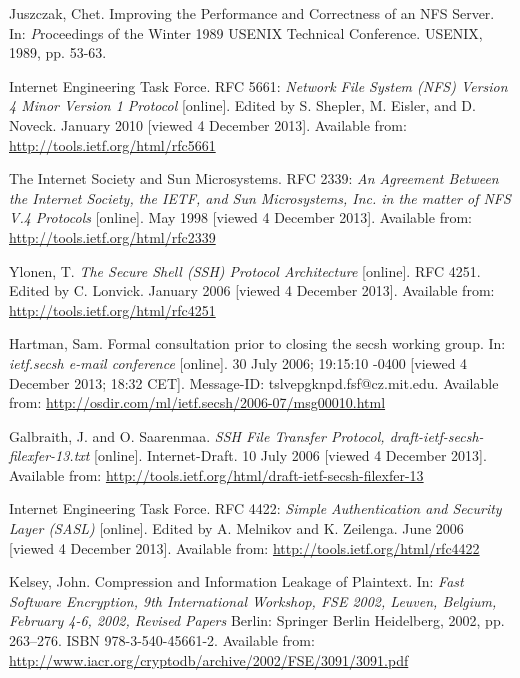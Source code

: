 \begin{thebibliography}{99}
	{\sc Juszczak,} Chet.
	Improving the Performance and Correctness of an NFS Server.
	In: {\emph Proceedings of the Winter 1989 USENIX Technical Conference}.
	USENIX, 1989, pp. 53-63.

	{\sc Internet Engineering Task Force}.
	RFC 5661:
	\emph{Network File System (NFS) Version 4 Minor Version 1 Protocol}
	[online].
	Edited by S. Shepler, M. Eisler, and D. Noveck.
	January 2010 [viewed 4 December 2013].
	Available from: \url{http://tools.ietf.org/html/rfc5661}

	{\sc The Internet Society} and {\sc Sun Microsystems}.
	RFC 2339:
	\emph{An Agreement Between the Internet Society, the IETF, and Sun Microsystems, Inc. in the matter of NFS V.4 Protocols}
	[online].
	May 1998 [viewed 4 December 2013].
	Available from: \url{http://tools.ietf.org/html/rfc2339}

	{\sc Ylonen,} T.
	\emph{The Secure Shell (SSH) Protocol Architecture}
	[online].
	RFC 4251.
	Edited by C. Lonvick.
	January 2006 [viewed 4 December 2013].
	Available from: \url{http://tools.ietf.org/html/rfc4251}

	{\sc Hartman,} Sam.
	Formal consultation prior to closing the secsh working group.
	In: \emph{ietf.secsh e-mail conference}
	[online].
	30 July 2006; 19:15:10 -0400 [viewed 4 December 2013; 18:32 CET].
	Message-ID: tslvepgknpd.fsf@cz.mit.edu.
	Available from: \newline \url{http://osdir.com/ml/ietf.secsh/2006-07/msg00010.html}

	{\sc Galbraith,} J. and O. {\sc Saarenmaa}.
	\emph{SSH File Transfer Protocol, draft-ietf-secsh-filexfer-13.txt}
	[online].
	Internet-Draft.
	10 July 2006 [viewed 4 December 2013].
	Available from: \newline \url{http://tools.ietf.org/html/draft-ietf-secsh-filexfer-13}


	{\sc Internet Engineering Task Force}.
	RFC 4422:
	\emph{Simple Authentication and Security Layer (SASL)}
	[online].
	Edited by A. Melnikov and K. Zeilenga.
	June 2006 [viewed 4 December 2013].
	Available from: \newline \url{http://tools.ietf.org/html/rfc4422}

	{\sc Kelsey,} John.
	Compression and Information Leakage of Plaintext.
	In: \emph{Fast Software Encryption, 9th International Workshop, FSE 2002,
	Leuven, Belgium, February 4-6, 2002, Revised Papers}
	Berlin: Springer Berlin Heidelberg, 2002, pp. 263--276.
	ISBN 978-3-540-45661-2.
	Available from: \url{http://www.iacr.org/cryptodb/archive/2002/FSE/3091/3091.pdf}


\end{thebibliography}
